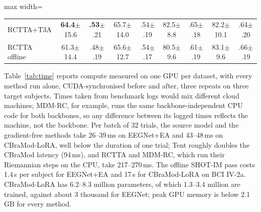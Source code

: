 \documentclass[preprint,12pt]{elsarticle}
\newcommand{\rev}[1]{#1}
\begin{document}
\begin{table}[!htbp]
\begin{adjustbox}{max width=\textwidth}
\begin{tabular}{@{}l cc cc cc cc@{}}
RCTTA+T3A & \textbf{64.4}{\tiny$\pm$15.6} & \textbf{.53}{\tiny$\pm$.21} & 65.7{\tiny$\pm$14.0} & .54{\tiny$\pm$.19} & 82.5{\tiny$\pm$8.8} & .65{\tiny$\pm$.18} & 82.2{\tiny$\pm$10.1} & .64{\tiny$\pm$.20}\\
RCTTA offline & 61.3{\tiny$\pm$14.4} & .48{\tiny$\pm$.19} & 65.6{\tiny$\pm$12.7} & .54{\tiny$\pm$.17} & 80.5{\tiny$\pm$9.6} & .61{\tiny$\pm$.19} & 83.1{\tiny$\pm$9.6} & .66{\tiny$\pm$.19}\\
\bottomrule
\end{tabular}
\end{adjustbox}
\end{table}


\rev{Table~\ref{tab:time} reports compute measured on one GPU per dataset, with every method run alone, CUDA-synchronised before and after, three repeats on three target subjects. Times taken from benchmark logs would mix different cloud machines; MDM-RC, for example, runs the same backbone-independent CPU code for both backbones, so any difference between its logged times reflects the machine, not the backbone. Per batch of 32 trials, the source model and the gradient-free methods take 26--39\,ms on EEGNet+EA and 43--48\,ms on CBraMod-LoRA, well below the duration of one trial; Tent roughly doubles the CBraMod latency (94\,ms), and RCTTA and MDM-RC, which run their Riemannian steps on the CPU, take 217--270\,ms. The offline SHOT-IM pass costs 1.4\,s per subject for EEGNet+EA and 17\,s for CBraMod-LoRA on BCI IV-2a. CBraMod-LoRA has 6.2--8.3 million parameters, of which 1.3--3.4 million are trained, against about 3 thousand for EEGNet; peak GPU memory is below 2.1\,GB for every method.}
\end{document}
